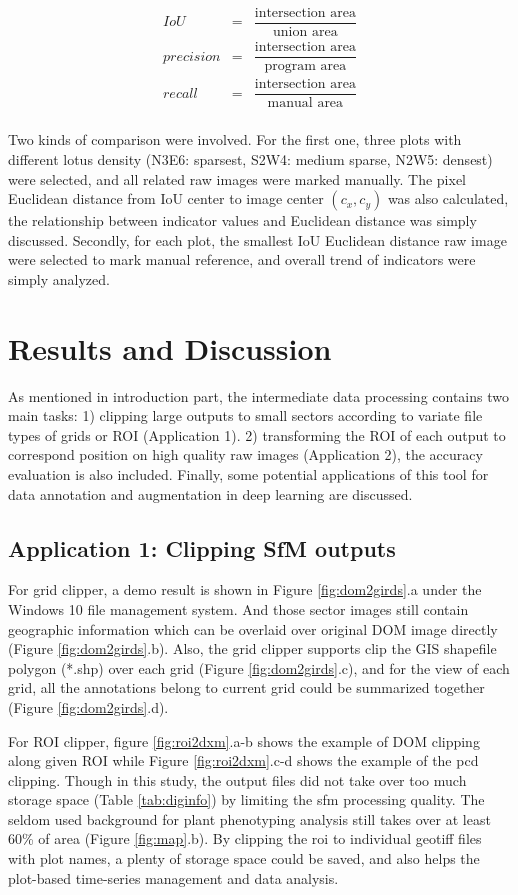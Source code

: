 \documentclass[doublespacing]{configs/bmcart}
\begin{document}
$$
\begin{array}{lcl}
  IoU & = & \dfrac{\text{intersection area}}{\text{union area}} \\
  precision & = & \dfrac{\text{intersection area}}{\text{program area}} \\
  recall & = & \dfrac{\text{intersection area}}{\text{manual area}} \\
\end{array}
$$

Two kinds of comparison were involved. For the first one, three plots with different lotus density (N3E6: sparsest, S2W4: medium sparse, N2W5: densest) were selected, and all related raw images were marked manually. The pixel Euclidean distance from IoU center to image center $(c_x, c_y)$ was also calculated, the relationship between indicator values and Euclidean distance was simply discussed. Secondly, for each plot, the smallest IoU Euclidean distance raw image were selected to mark manual reference, and overall trend of indicators were simply analyzed.

\section*{Results and Discussion}
As mentioned in introduction part, the intermediate data processing contains two main tasks: 1) clipping large outputs to small sectors according to variate file types of grids or ROI (Application 1). 2) transforming the ROI of each output to correspond position on high quality raw images (Application 2), the accuracy evaluation is also included. Finally, some potential applications of this tool for data annotation and augmentation in deep learning are discussed.

\subsection*{Application 1: Clipping SfM outputs}
For grid clipper, a demo result is shown in Figure \ref{fig:dom2girds}.a under the Windows 10 file management system. And those sector images still contain geographic information which can be overlaid over original DOM image directly (Figure \ref{fig:dom2girds}.b). Also, the grid clipper supports clip the GIS shapefile polygon (*.shp) over each grid (Figure \ref{fig:dom2girds}.c), and for the view of each grid, all the annotations belong to current grid could be summarized together (Figure \ref{fig:dom2girds}.d).

For ROI clipper, figure \ref{fig:roi2dxm}.a-b shows the example of DOM clipping along given ROI while Figure \ref{fig:roi2dxm}.c-d shows the example of the \acrshort*{pcd} clipping. Though in this study, the output files did not take over too much storage space (Table \ref{tab:diginfo}) by limiting the \acrshort*{sfm} processing quality. The seldom used background for plant phenotyping analysis still takes over at least 60\% of area (Figure \ref{fig:map}.b). By clipping the \acrshort*{roi} to individual geotiff files with plot names, a plenty of storage space could be saved, and also helps the plot-based time-series management and data analysis. 
\end{document}
